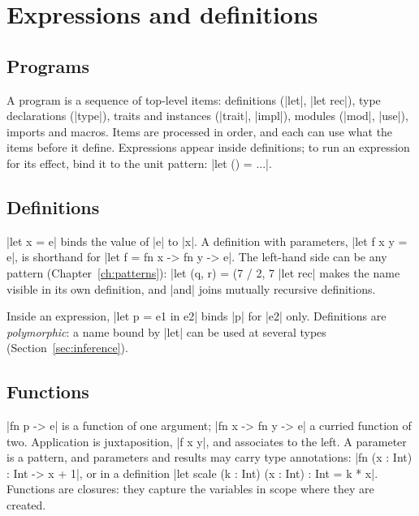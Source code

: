 \chapter{Expressions and definitions}
\label{ch:expressions}

\section{Programs}
A program is a sequence of top-level items: definitions (\fc|let|,
\fc|let rec|), type declarations (\fc|type|), traits and instances
(\fc|trait|, \fc|impl|), modules (\fc|mod|, \fc|use|), imports and macros.
Items are processed in order, and each can use what the items before it
define. Expressions appear inside definitions; to run an expression for its
effect, bind it to the unit pattern: \fc|let () = ...|.

\section{Definitions}
\label{sec:let}

\fc|let x = e| binds the value of \fc|e| to \fc|x|. A definition with
parameters, \fc|let f x y = e|, is shorthand for
\fc|let f = fn x -> fn y -> e|. The left-hand side can be any pattern
(Chapter~\ref{ch:patterns}): \fc|let (q, r) = (7 / 2, 7 %
\fc|let rec| makes the name visible in its own definition, and \fc|and|
joins mutually recursive definitions.

Inside an expression, \fc|let p = e1 in e2| binds \fc|p| for \fc|e2| only.
Definitions are \emph{polymorphic}: a name bound by \fc|let| can be used at
several types (Section~\ref{sec:inference}).


\section{Functions}
\label{sec:functions}

\fc|fn p -> e| is a function of one argument; \fc|fn x -> fn y -> e| a
curried function of two. Application is juxtaposition, \fc|f x y|, and
associates to the left. A parameter is a pattern, and parameters and results
may carry type annotations: \fc|fn (x : Int) : Int -> x + 1|, or in a
definition \fc|let scale (k : Int) (x : Int) : Int = k * x|. Functions are
closures: they capture the variables in scope where they are created.

